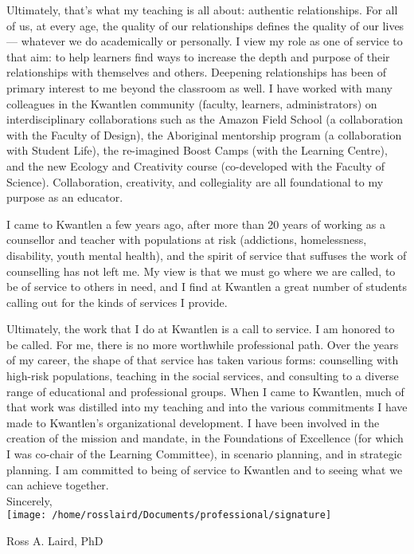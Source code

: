 \documentclass[12pt, letterpaper]{article}
\begin{document}
Ultimately, that’s what my teaching is all about: authentic relationships. For all of
us, at every age, the quality of our relationships defines the quality of our
lives — whatever we do academically or personally. I view my role as one of
service to that aim: to help learners find ways to increase the depth and
purpose of their relationships with themselves and others. Deepening relationships has been of primary interest to me beyond the classroom as well. I have worked with many colleagues in the Kwantlen community (faculty, learners, administrators) on interdisciplinary collaborations such as the Amazon Field School (a collaboration with the Faculty of Design), the Aboriginal mentorship program (a collaboration with Student Life), the re-imagined Boost Camps (with the Learning Centre), and the new Ecology and Creativity course (co-developed with the Faculty of Science). Collaboration, creativity, and collegiality are all foundational to my purpose as an educator.

I came to Kwantlen a few years ago, after more than 20 years of working as a
counsellor and teacher with populations at risk (addictions, homelessness,
disability, youth mental health), and the spirit of service that suffuses the
work of counselling has not left me. My view is that we must go where we are
called, to be of service to others in need, and I find at Kwantlen a great
number of students calling out for the kinds of services I provide.

Ultimately, the work that I do at Kwantlen is a call to service. I am honored to be called. For me, there is no more worthwhile professional path. Over the
years of my career, the shape of that service has taken various forms:
counselling with high-risk populations, teaching in the social services, and
consulting to a diverse range of educational and professional groups. When I
came to Kwantlen, much of that work was distilled into my teaching and into the various commitments I have made to Kwantlen’s organizational development. I have been involved in the creation of the mission and mandate, in the Foundations of Excellence (for which I was co-chair of the Learning Committee), in scenario planning, and in strategic planning. I am committed to being of service to Kwantlen and to seeing what we can achieve together.
\\[1em]
\noindent
Sincerely,\\[2em]
    \texttt{[image: /home/rosslaird/Documents/professional/signature]}

\noindent
Ross A. Laird, PhD\\
\end{document}
